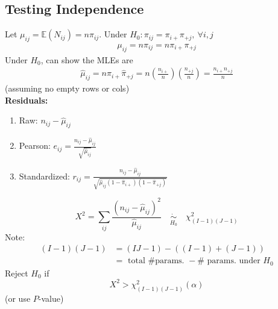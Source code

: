 \documentclass[11pt]{elegantbook}
\begin{document}
\subsection{Testing Independence}
Let $\mu_{ij}=\mathbb{E}(N_{ij})=n\pi_{ij}$. Under $H_0:\pi_{ij}=\pi_{i+}\pi_{+j},\ \forall i,j$
\begin{equation}
    \begin{aligned}
        \mu_{ij}=n\pi_{ij}=n\pi_{i+}\pi_{+j}
    \end{aligned}
    \nonumber
\end{equation}
Under $H_0$, can show the MLEs are
\begin{equation}
    \begin{aligned}
        \hat{\mu}_{ij}=n\hat{\pi}_{i+}\hat{\pi}_{+j}=n\left(\frac{n_{i+}}{n}\right)\left(\frac{n_{+j}}{n}\right)=\frac{n_{i+}n_{+j}}{n}
    \end{aligned}
    \nonumber
\end{equation}
(assuming no empty rows or cols)\\
\textbf{Residuals:}
\begin{enumerate}
    \item Raw: $n_{ij}-\hat{\mu}_{ij}$
    \item Pearson: $e_{ij}=\frac{n_{ij}-\hat{\mu}_{ij}}{\sqrt{\hat{\mu}_{ij}}}$
    \item Standardized: $r_{ij}=\frac{n_{ij}-\hat{\mu}_{ij}}{\sqrt{\hat{\mu}_{ij}(1-\hat{\pi}_{i+})(1-\hat{\pi}_{+j})}}$
\end{enumerate}
\begin{definition}
    $$X^2=\sum_{i j} \frac{\left(n_{i j}-\hat{\mu}_{i j}\right)^2}{\hat{\mu}_{i j}} \quad \underset{H_0}{\dot{\sim}}\quad \chi_{(I-1)(J-1)}^2$$
    Note:
    $$
    \begin{aligned}
    (I-1)(J-1) & =(I J-1)-((I-1)+(J-1)) \\
    & =\text { total \# params. }-\# \text { params. under } H_0
    \end{aligned}
    $$
    Reject $H_0$ if
    $$
    X^2>\chi_{(I-1)(J-1)}^2(\alpha)
    $$
    (or use $P$-value)
\end{definition}
\end{document}
